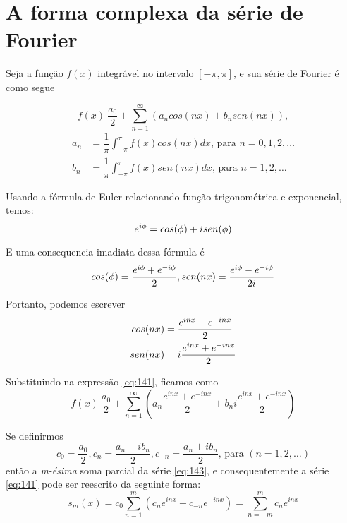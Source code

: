 \chapter{A forma complexa da série de Fourier}

Seja a função $f(x)$ integrável no intervalo $[-\pi, \pi]$, e sua série de Fourier
é como segue

\begin{equation}
\label{eq:141}
    f(x) ~ \dfrac{a_0}{2} + \sum\limits_{n=1}^{\infty}(a_n cos(nx) + b_n sen(nx)),
\end{equation}
\begin{equation}
    \label{eq:142}
    \begin{split}
        a_n &= \dfrac{1}{\pi}\int_{-\pi}^{\pi}f(x)cos(nx)dx\text{, para }n = 0, 1, 2, \ldots\\
        b_n &= \dfrac{1}{\pi}\int_{-\pi}^{\pi}f(x)sen(nx)dx\text{, para }n = 1, 2, \ldots
    \end{split}
\end{equation}

Usando a fórmula de Euler relacionando função trigonométrica e exponencial, temos:
\begin{equation}
    \notag
    e^{i\phi} = cos(\phi) + i sen(\phi)
\end{equation}

E uma consequencia imadiata dessa fórmula é 
\begin{equation}
    \notag
    cos(\phi) = \dfrac{e^{i\phi} + e^{-i\phi}}{2}, sen(nx) = \dfrac{e^{i\phi} - e^{-i\phi}}{2i}
\end{equation}

Portanto, podemos escrever 
\begin{equation}
    \notag
    \begin{split}
        cos(nx) &= \dfrac{e^{inx} + e^{-inx}}{2}\\
        sen(nx) &= i\dfrac{e^{inx} + e^{-inx}}{2}
    \end{split}
\end{equation}

Substituindo na expressão \ref{eq:141}, ficamos como
\begin{equation}
\label{eq:143}
    f(x) ~ \dfrac{a_0}{2} + \sum\limits_{n=1}^{\infty}(a_n\dfrac{e^{inx} + e^{-inx}}{2} + b_n i\dfrac{e^{inx} + e^{-inx}}{2})
\end{equation}

Se definirmos
\begin{equation}
    \label{eq:144}
    c_0 = \dfrac{a_0}{2}, c_n = \dfrac{a_n - ib_n}{2}, c_{-n}=\dfrac{a_n + ib_n}{2}\text{, para }(n = 1, 2, \ldots)
\end{equation}
então a \textit{m-ésima} soma parcial da série \ref{eq:143}, e consequentemente a série \ref{eq:141}
pode ser reescrito da seguinte forma: 
\begin{equation}
\label{eq:145}
    s_m(x) = c_0 \sum\limits_{n=1}^{m}(c_n e^{inx} + c_{-n} e^{-inx}) = \sum\limits_{n=-m}^{m}c_n e^{inx}
\end{equation}

